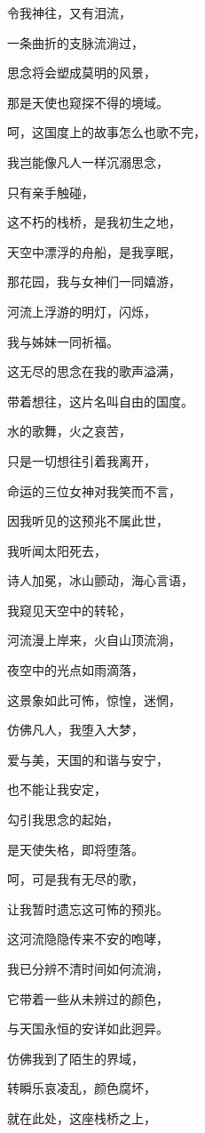 \documentclass[UTF8]{article}
\begin{document}
\par 令我神往，又有泪流，
\par 一条曲折的支脉流淌过，
\par 思念将会塑成莫明的风景，
\par 那是天使也窥探不得的境域。
\par 呵，这国度上的故事怎么也歌不完，
\par 我岂能像凡人一样沉溺思念，
\par 只有亲手触碰，
\par 这不朽的栈桥，是我初生之地，
\par 天空中漂浮的舟船，是我享眠，
\par 那花园，我与女神们一同嬉游，
\par 河流上浮游的明灯，闪烁，
\par 我与姊妹一同祈福。
\par 这无尽的思念在我的歌声溢满，
\par 带着想往，这片名叫自由的国度。
\par 水的歌舞，火之哀苦，
\par 只是一切想往引着我离开，
\par 命运的三位女神对我笑而不言，
\par 因我听见的这预兆不属此世，
\par 我听闻太阳死去，
\par 诗人加冕，冰山颤动，海心言语，
\par 我窥见天空中的转轮，
\par 河流漫上岸来，火自山顶流淌，
\par 夜空中的光点如雨滴落，
\par 这景象如此可怖，惊惶，迷惘，
\par 仿佛凡人，我堕入大梦，
\par 爱与美，天国的和谐与安宁，
\par 也不能让我安定，
\par 勾引我思念的起始，
\par 是天使失格，即将堕落。
\par 呵，可是我有无尽的歌，
\par 让我暂时遗忘这可怖的预兆。
\par 这河流隐隐传来不安的咆哮，
\par 我已分辨不清时间如何流淌，
\par 它带着一些从未辨过的颜色，
\par 与天国永恒的安详如此迥异。
\par 仿佛我到了陌生的界域，
\par 转瞬乐哀凌乱，颜色腐坏，
\par 就在此处，这座栈桥之上，
\end{document}
